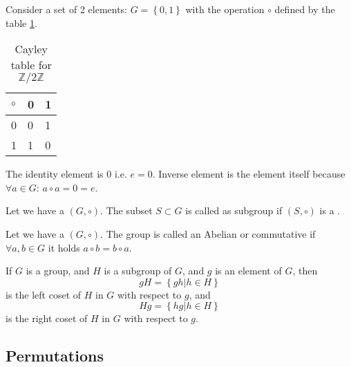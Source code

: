 \begin{example}
  Consider a set of 2 elements: $G = \left\{0, 1\right\}$ with the
  operation $\circ$ defined by the table \ref{tab:CayleyZ2Z}.
  \begin{table}
    \centering
    \caption{Cayley table for $\mathbb{Z}/2\mathbb{Z}$}
    \label{tab:CayleyZ2Z}
    \begin{tabular}{l|ll}
      \toprule
      $\circ$ & 0 & 1 \\
      \midrule
      0 & 0 & 1 \\
      1 & 1 & 0 \\
      \bottomrule
    \end{tabular}
  \end{table}

  The identity element is $0$ i.e. $e = 0$.
  Inverse element is the element itself
  because $\forall a \in G$: $a \circ a = 0 = e$.
  \label{ex:group}
\end{example}

\begin{definition}[Subgroup]
  Let we have a  $\left(G, \circ\right)$. The
  subset $S \subset G$ is called as subgroup if $\left(S,
  \circ\right)$ is a .
  \label{def:subgroup}
\end{definition}

\begin{definition}
  Let we have a  $\left(G, \circ\right)$.
  The group is called an Abelian or commutative if
  $\forall a, b \in G$ it holds $a \circ b = b \circ a$.
  \label{def:abeliangroup}
\end{definition}

\begin{definition}[Coset]
  If $G$ is a group, and $H$ is a subgroup of $G$, and $g$ is an
  element of $G$, then
  \[
  gH = \left\{ gh \vert h \in H\right\}
  \]
  is the left coset of $H$ in $G$ with respect to $g$, and
  \[
  Hg = \left\{ hg \vert h \in H\right\}
  \]
  is the right coset of $H$ in $G$ with respect to $g$.
  \label{def:coset}
\end{definition}
  
\subsection{Permutations}

